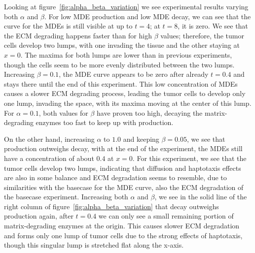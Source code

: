 Looking at figure~\ref{fig:alpha_beta_variation} we see experimental results varying both $\alpha$ and $\beta$. For low MDE production and low MDE decay, we can see that the curve for the MDEs is still visible at up to $t=4$; at $t=8$, it is zero. We see that the ECM degrading happens faster than for high $\beta$ values; therefore, the tumor cells develop two lumps, with one invading the tissue and the other staying at $x=0$. The maxima for both lumps are lower than in previous experiments, though the cells seem to be more evenly distributed between the two lumps. Increasing $\beta=0.1$, the MDE curve appears to be zero after already $t=0.4$ and stays there until the end of this experiment. This low concentration of MDEs causes a slower ECM degrading process, leading the tumor cells to develop only one lump, invading the space, with its maxima moving at the center of this lump. For $\alpha=0.1$, both values for $\beta$ have proven too high, decaying the matrix-degrading enzymes too fast to keep up with production.

On the other hand, increasing $\alpha$ to $1.0$ and keeping $\beta=0.05$, we see that production outweighs decay, with at the end of the experiment, the MDEs still have a concentration of about $0.4$ at $x=0$. For this experiment, we see that the tumor cells develop two lumps, indicating that diffusion and haptotaxis effects are also in some balance and ECM degradation seems to resemble, due to similarities with the basecase for the MDE curve, also the ECM degradation of the basecase experiment.
Increasing both $\alpha$ and $\beta$, we see in the solid line of the right column of figure~\ref{fig:alpha_beta_variation} that decay outweighs production again, after $t=0.4$ we can only see a small remaining portion of matrix-degrading enzymes at the origin. This causes slower ECM degradation and forms only one lump of tumor cells due to the strong effects of haptotaxis, though this singular lump is stretched flat along the x-axis.

